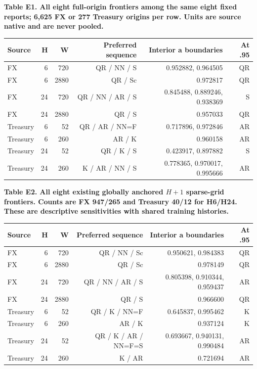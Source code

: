 \documentclass[10pt,a4paper]{article}
\begin{document}
\begin{center}
\begin{minipage}{\linewidth}
\small\textbf{Table E1. All eight full-origin frontiers among the same eight fixed reports; 6,625 FX or 277 Treasury origins per row. Units are source native and are never pooled.}\par\medskip
\centering\fontsize{8}{10}\selectfont
\begin{tabular}{lrrrrr}
\toprule
Source & H & W & Preferred sequence & Interior a boundaries & At .95 \\
\midrule
FX & 6 & 720 & QR / NN / S & 0.952882, 0.964505 & QR \\
FX & 6 & 2880 & QR / Sc & 0.972817 & QR \\
FX & 24 & 720 & QR / NN / AR / S & 0.845488, 0.889246, 0.938369 & S \\
FX & 24 & 2880 & QR / S & 0.957033 & QR \\
Treasury & 6 & 52 & QR / AR / NN=F & 0.717896, 0.972846 & AR \\
Treasury & 6 & 260 & AR / K & 0.960158 & AR \\
Treasury & 24 & 52 & QR / K / S & 0.423917, 0.897882 & S \\
Treasury & 24 & 260 & K / AR / NN / S & 0.778365, 0.970017, 0.995666 & AR \\
\bottomrule
\end{tabular}
\end{minipage}
\end{center}
\begin{center}
\begin{minipage}{\linewidth}
\small\textbf{Table E2. All eight existing globally anchored \(H+1\) sparse-grid frontiers. Counts are FX 947/265 and Treasury 40/12 for H6/H24. These are descriptive sensitivities with shared training histories.}\par\medskip
\centering\fontsize{8}{10}\selectfont
\begin{tabular}{lrrrrr}
\toprule
Source & H & W & Preferred sequence & Interior a boundaries & At .95 \\
\midrule
FX & 6 & 720 & QR / NN / Sc & 0.950621, 0.984383 & QR \\
FX & 6 & 2880 & QR / Sc & 0.978149 & QR \\
FX & 24 & 720 & QR / NN / AR / S & 0.805398, 0.910344, 0.959437 & AR \\
FX & 24 & 2880 & QR / S & 0.966600 & QR \\
Treasury & 6 & 52 & QR / K / NN=F & 0.645837, 0.995462 & K \\
Treasury & 6 & 260 & AR / K & 0.937124 & K \\
Treasury & 24 & 52 & QR / K / AR / NN=F=S & 0.693667, 0.940131, 0.990484 & AR \\
Treasury & 24 & 260 & K / AR & 0.721694 & AR \\
\bottomrule
\end{tabular}
\end{minipage}
\end{center}
\end{document}
